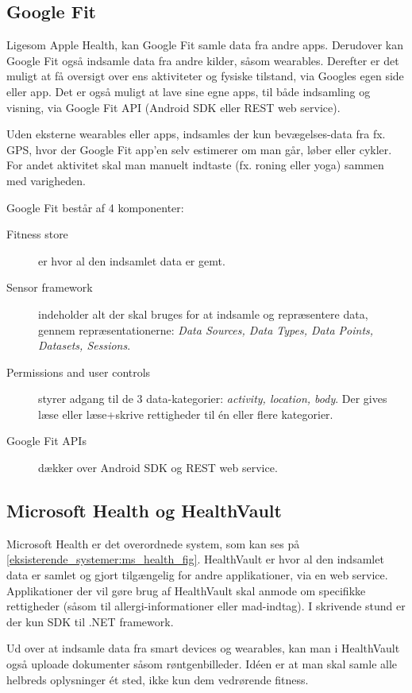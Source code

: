 \subsection{Google Fit}
Ligesom Apple Health, kan Google Fit samle data fra andre apps.
Derudover kan Google Fit også indsamle data fra andre kilder, såsom wearables.
Derefter er det muligt at få oversigt over ens aktiviteter og fysiske tilstand, via Googles egen side eller app.
Det er også muligt at lave sine egne apps, til både indsamling og visning, via Google Fit API (Android SDK eller REST web service).

Uden eksterne wearables eller apps, indsamles der kun bevægelses-data fra fx. GPS, hvor der Google Fit app'en selv estimerer om man går, løber eller cykler.
For andet aktivitet skal man manuelt indtaste (fx. roning eller yoga) sammen med varigheden.

Google Fit består af 4 komponenter:

\begin{description}
\item[Fitness store] er hvor al den indsamlet data er gemt.
\item[Sensor framework] indeholder alt der skal bruges for at indsamle og repræsentere data, gennem repræsentationerne: \textit{Data Sources, Data Types, Data Points, Datasets, Sessions}.
\item[Permissions and user controls] styrer adgang til de 3 data-kategorier: \textit{activity, location, body}.
Der gives læse eller læse+skrive rettigheder til én eller flere kategorier.
\item[Google Fit APIs] dækker over Android SDK og REST web service.
\end{description}

\subsection{Microsoft Health og HealthVault}
Microsoft Health er det overordnede system, som kan ses på \cref{eksisterende_systemer:ms_health_fig}.
HealthVault er hvor al den indsamlet data er samlet og gjort tilgængelig for andre applikationer, via en web service.
Applikationer der vil gøre brug af HealthVault skal anmode om specifikke rettigheder (såsom til allergi-informationer eller mad-indtag).
I skrivende stund er der kun SDK til .NET framework.

Ud over at indsamle data fra smart devices og wearables, kan man i HealthVault også uploade dokumenter såsom røntgenbilleder.
Idéen er at man skal samle alle helbreds oplysninger ét sted, ikke kun dem vedrørende fitness.

